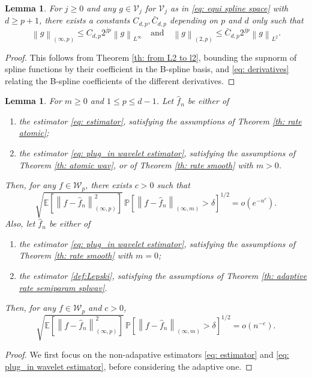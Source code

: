 \documentclass[preprint]{imsart}
\newcommand\norm[1]{\left\lVert#1\right\rVert}
\newtheorem{lemma}[theorem]{Lemma}
\numberwithin{equation}{section}
\begin{document}
\begin{appendix}
\begin{lemma}\label{lemma: bound norm deriv splines}
    For $j\geq 0$ and any $g\in \mathcal{V}_j$ for $\mathcal{V}_j$ as in \eqref{eq: equi spline space} with $d\geq p+1$, there exists a constants $C_{d,p},\bar{C}_{d,p}$ depending on $p$ and $d$ only such that
    \[\norm{g}_{(\infty,p)}\leq C_{d,p} 2^{jp} \norm{g}_{L^\infty}\quad\text{and}\quad \norm{g}_{(2,p)}\leq \bar{C}_{d,p} 2^{jp} \norm{g}_{L^2}.\]
\end{lemma}
\begin{proof}
    This follows from Theorem \ref{th: from L2 to l2}, bounding the supnorm of spline functions by their coefficient in the B-spline basis, and \eqref{eq: derivatives} relating the B-spline coefficients of the different derivatives.
\end{proof}

\begin{lemma}\label{lem: exponential decay outer taylor exp}
For $m\geq 0$ and $1\leq p\leq d-1$.  Let $\hat{f}_n$ be either of
\begin{enumerate}
    \item the estimator \eqref{eq: estimator}, satisfying the assumptions of Theorem \ref{th: rate atomic};
    \item the estimator \eqref{eq: plug_in wavelet estimator}, satisfying the assumptions of Theorem \ref{th: atomic wav}, or of Theorem \ref{th: rate smooth} with $m>0$.
\end{enumerate}
Then, for any $f\in\mathcal{W}_p$, there exists $c>0$ such that
\[\sqrt{\mathbb{E}\left[\norm{f-\hat{f}_n}_{(\infty,p)}^2\right]}\, \mathbb{P}\left[\norm{f-\hat{f}_n}_{(\infty,m)}> \delta\right]^{1/2}= o(e^{-n^{c}}).\]
Also, let $\hat{f}_n$ be either of
\begin{enumerate}
    \item the estimator \eqref{eq: plug_in wavelet estimator}, satisfying the assumptions of Theorem \ref{th: rate smooth} with $m=0$;
    \item the estimator \eqref{def:Lepski}, satisfying the assumptions of Theorem \ref{th: adaptive rate semiparam splwav}.
\end{enumerate}
Then, for any $f\in\mathcal{W}_p$ and $c>0$,
\[\sqrt{\mathbb{E}\left[\norm{f-\hat{f}_n}_{(\infty,p)}^2\right]}\, \mathbb{P}\left[\norm{f-\hat{f}_n}_{(\infty,m)}> \delta\right]^{1/2}= o(n^{-c}).\]
\end{lemma}
\begin{proof}
We first focus on the non-adapative estimators \eqref{eq: estimator} and \eqref{eq: plug_in wavelet estimator}, before considering the adaptive one.


\end{proof}
\end{appendix}
\end{document}
